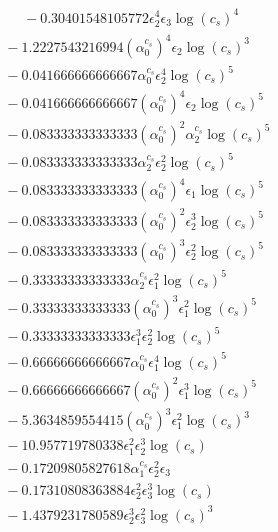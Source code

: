 \documentclass[10pt]{article}
\begin{document}
\begin{align*}
\phantom{F_{s,5}} &\phantom{={}}{}  - 0.30401548105772 \epsilon_{2}^{4} \epsilon_{3} \log{\left(c_{s} \right)}^{4} \\
&{}  - 1.2227543216994 \left(\alpha_{0}^{c_s}\right)^{4} \epsilon_{2} \log{\left(c_{s} \right)}^{3} \\
&{}  - 0.041666666666667 \alpha_{0}^{c_s} \epsilon_{2}^{4} \log{\left(c_{s} \right)}^{5} \\
&{}  - 0.041666666666667 \left(\alpha_{0}^{c_s}\right)^{4} \epsilon_{2} \log{\left(c_{s} \right)}^{5} \\
&{}  - 0.083333333333333 \left(\alpha_{0}^{c_s}\right)^{2} \alpha_{2}^{c_s} \log{\left(c_{s} \right)}^{5} \\
&{}  - 0.083333333333333 \alpha_{2}^{c_s} \epsilon_{2}^{2} \log{\left(c_{s} \right)}^{5} \\
&{}  - 0.083333333333333 \left(\alpha_{0}^{c_s}\right)^{4} \epsilon_{1} \log{\left(c_{s} \right)}^{5} \\
&{}  - 0.083333333333333 \left(\alpha_{0}^{c_s}\right)^{2} \epsilon_{2}^{3} \log{\left(c_{s} \right)}^{5} \\
&{}  - 0.083333333333333 \left(\alpha_{0}^{c_s}\right)^{3} \epsilon_{2}^{2} \log{\left(c_{s} \right)}^{5} \\
&{}  - 0.33333333333333 \alpha_{2}^{c_s} \epsilon_{1}^{2} \log{\left(c_{s} \right)}^{5} \\
&{}  - 0.33333333333333 \left(\alpha_{0}^{c_s}\right)^{3} \epsilon_{1}^{2} \log{\left(c_{s} \right)}^{5} \\
&{}  - 0.33333333333333 \epsilon_{1}^{3} \epsilon_{2}^{2} \log{\left(c_{s} \right)}^{5} \\
&{}  - 0.66666666666667 \alpha_{0}^{c_s} \epsilon_{1}^{4} \log{\left(c_{s} \right)}^{5} \\
&{}  - 0.66666666666667 \left(\alpha_{0}^{c_s}\right)^{2} \epsilon_{1}^{3} \log{\left(c_{s} \right)}^{5} \\
&{}  - 5.3634859554415 \left(\alpha_{0}^{c_s}\right)^{3} \epsilon_{1}^{2} \log{\left(c_{s} \right)}^{3} \\
&{}  - 10.957719780338 \epsilon_{1}^{2} \epsilon_{2}^{3} \log{\left(c_{s} \right)} \\
&{}  - 0.17209805827618 \alpha_{1}^{c_s} \epsilon_{2}^{2} \epsilon_{3} \\
&{}  - 0.17310808363884 \epsilon_{2}^{2} \epsilon_{3}^{3} \log{\left(c_{s} \right)} \\
&{}  - 1.4379231780589 \epsilon_{2}^{3} \epsilon_{3}^{2} \log{\left(c_{s} \right)}^{3} \\

\end{align*}
\end{document}
